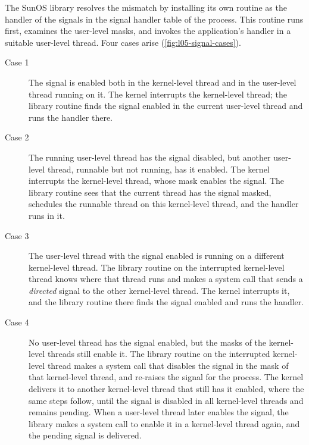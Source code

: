 \documentclass[../main.tex]{subfiles}
\begin{document}
The SunOS library resolves the mismatch by installing its own routine as
the handler of the signals in the signal handler table of the process.
This routine runs first, examines the user-level masks, and invokes the
application's handler in a suitable user-level thread.  Four cases arise
(\cref{fig:l05-signal-cases}).
\begin{description}
  \item[Case 1] The signal is enabled both in the kernel-level thread and
    in the user-level thread running on it.  The kernel interrupts the
    kernel-level thread; the library routine finds the signal enabled in
    the current user-level thread and runs the handler there.
  \item[Case 2] The running user-level thread has the signal disabled, but
    another user-level thread, runnable but not running, has it enabled.
    The kernel interrupts the kernel-level thread, whose mask enables the
    signal.  The library routine sees that the current thread has the
    signal masked, schedules the runnable thread on this kernel-level
    thread, and the handler runs in it.
  \item[Case 3] The user-level thread with the signal enabled is running
    on a different kernel-level thread.  The library routine on the
    interrupted kernel-level thread knows where that thread runs and makes a
    system call that sends a \emph{directed} signal to the other
    kernel-level thread.  The kernel interrupts it, and the library routine
    there finds the signal enabled and runs the handler.
  \item[Case 4] No user-level thread has the signal enabled, but the masks
    of the kernel-level threads still enable it.  The library routine on
    the interrupted kernel-level thread makes a system call that disables
    the signal in the mask of that kernel-level thread, and re-raises the
    signal for the process.  The kernel delivers it to another
    kernel-level thread that still has it enabled, where the same steps
    follow, until the signal is disabled in all kernel-level threads and
    remains pending.  When a user-level thread later enables the signal,
    the library makes a system call to enable it in a kernel-level thread
    again, and the pending signal is delivered.
\end{description}
\end{document}
